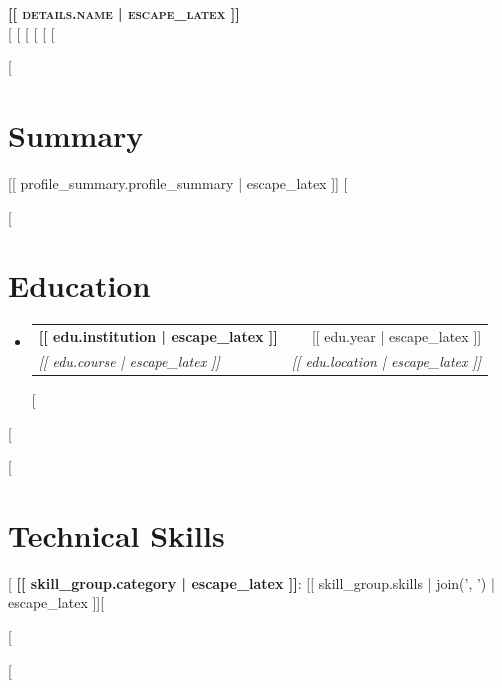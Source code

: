 \documentclass[letterpaper,11pt]{article}
\makeatletter
\newcommand{\resumeSubheading}[4]{
  \vspace{-2pt}\item
  \begin{tabular*}{0.97\textwidth}[t]{l@{\extracolsep{\fill}}r}
    \textbf{#1} & #2 \\
    \textit{\small#3} & \textit{\small #4} \\
  \end{tabular*}\vspace{-7pt}
}
\newcommand{\resumeSubHeadingListStart}{\begin{itemize}[leftmargin=0.15in, label={}]}
\newcommand{\resumeSubHeadingListEnd}{\end{itemize}}
\makeatother
\begin{document}
\begin{center}
  \textbf{\Huge \scshape [[ details.name | escape_latex ]]} \\ \vspace{1pt}
  \small 
  [%
  [%
  [%
  [%
  [%
  [%
\end{center}

[%
\section{Summary}
\small [[ profile_summary.profile_summary | escape_latex ]]
\vspace{-10pt}
[%

[%
\section{Education}
  \resumeSubHeadingListStart
    [%
    \resumeSubheading
      {[[ edu.institution | escape_latex ]]}{[[ edu.year | escape_latex ]]}
      {[[ edu.course | escape_latex ]]}{[[ edu.location | escape_latex ]]}
    [%
  \resumeSubHeadingListEnd
[%

[%
\section{Technical Skills}
 \begin{itemize}[leftmargin=0.15in, label={}]
    \small{\item{
    [%
     \textbf{[[ skill_group.category | escape_latex ]]}{: [[ skill_group.skills | join(', ') | escape_latex ]]}[%

    [%
    }}
 \end{itemize}
[%
\end{document}
